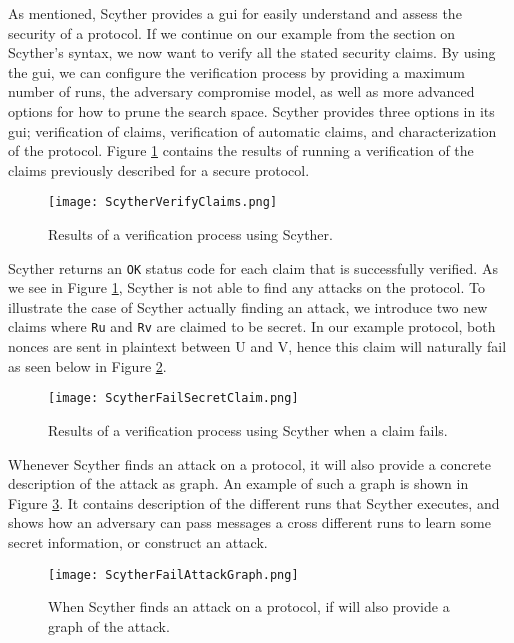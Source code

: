 As mentioned, Scyther provides a \gls{gui} for easily understand and assess the security of a protocol. 
If we continue on our example from the section on Scyther's syntax, we now want to verify all the stated security claims. By using the \gls{gui}, we can configure the verification process by providing a maximum number of runs, the adversary compromise model, as well as more advanced options for how to prune the search space. Scyther provides three options in its \gls{gui}; verification of claims, verification of automatic claims, and characterization of the protocol. Figure \ref{fig:scyther-verify-claims} contains the results of running a verification of the claims previously described for a secure protocol.

\begin{figure}[h]
	\centering
	\texttt{[image: ScytherVerifyClaims.png]}
	\caption{Results of a verification process using Scyther.}
	\label{fig:scyther-verify-claims}
\end{figure}


Scyther returns an \texttt{OK} status code for each claim that is successfully verified. As we see in Figure \ref{fig:scyther-verify-claims}, Scyther is not able to find any attacks on the protocol. To illustrate the case of Scyther actually finding an attack, we introduce two new claims where \texttt{Ru} and \texttt{Rv} are claimed to be secret. In our example protocol, both nonces are sent in plaintext between U and V, hence this claim will naturally fail as seen below in Figure \ref{fig:scyther-verify-claims-fail}.

\begin{figure}[h]
	\centering
	\texttt{[image: ScytherFailSecretClaim.png]}
	\caption{Results of a verification process using Scyther when a claim fails.}
	\label{fig:scyther-verify-claims-fail}
\end{figure}

Whenever Scyther finds an attack on a protocol, it will also provide a concrete description of the attack as graph. An example of such a graph is shown in Figure \ref{fig:scyther-graph}. It contains description of the different runs that Scyther executes, and shows how an adversary can pass messages a cross different runs to learn some secret information, or construct an attack.

\begin{figure}[h]
	\centering
	\texttt{[image: ScytherFailAttackGraph.png]}
	\caption{When Scyther finds an attack on a protocol, if will also provide a graph of the attack.}
	\label{fig:scyther-graph}
\end{figure}
